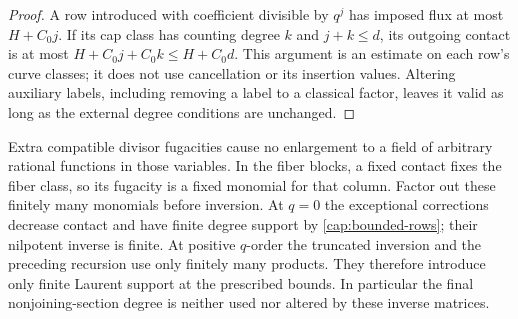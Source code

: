 \begin{proof}
A row introduced with coefficient divisible by $q^j$ has imposed
flux at most $H+C_0j$.  If its cap class has counting degree $k$
and $j+k\leq d$, its outgoing contact is at most
$H+C_0j+C_0k\leq H+C_0d$.  This argument is an estimate on each
row's curve classes; it does not use cancellation or its insertion
values.  Altering auxiliary labels, including removing a label to
a classical factor, leaves it valid as long as the external degree
conditions are unchanged.
\end{proof}

Extra compatible divisor fugacities cause no enlargement to a field of
arbitrary rational functions in those variables.  In the fiber blocks,
a fixed contact fixes the fiber class, so its fugacity is a fixed
monomial for that column.  Factor out these finitely many monomials
before inversion.  At $q=0$ the exceptional corrections decrease
contact and have finite degree support by \cref{cap:bounded-rows};
their nilpotent inverse is finite.  At positive $q$-order the truncated
inversion and the preceding recursion use only finitely many products.
They therefore introduce only finite Laurent support at the prescribed
bounds.  In particular the final nonjoining-section degree is neither
used nor altered by these inverse matrices.

